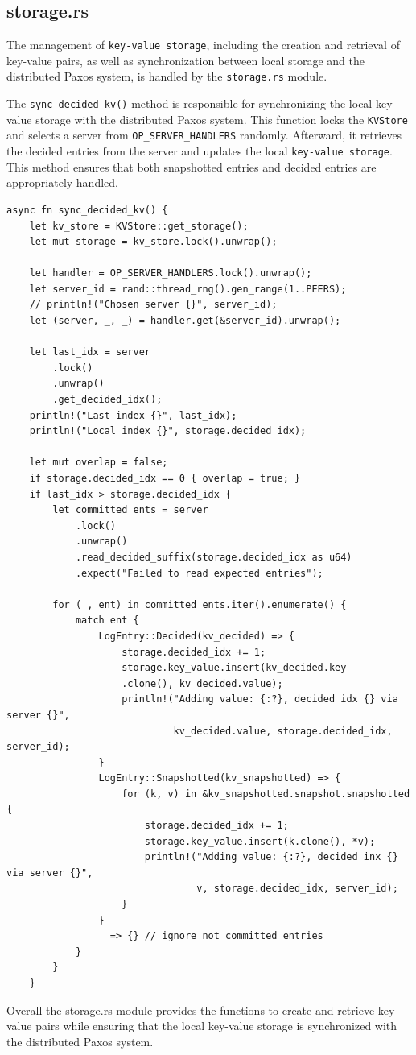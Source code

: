 \documentclass[a4paper, 11pt]{article}
\begin{document}
\subsection{storage.rs}

The management of \verb|key-value storage|, including the creation and retrieval of key-value pairs, as well as synchronization between local storage and the distributed Paxos system, is handled by the \verb|storage.rs| module.
\par
The \verb|sync_decided_kv()| method is responsible for synchronizing the local key-value storage with the distributed Paxos system. This function locks the \verb|KVStore| and selects a server from \verb|OP_SERVER_HANDLERS| randomly. Afterward, it retrieves the decided entries from the server and updates the local \verb|key-value storage|. This method ensures that both snapshotted entries and decided entries are appropriately handled.
\begin{verbatim}
async fn sync_decided_kv() {
    let kv_store = KVStore::get_storage();
    let mut storage = kv_store.lock().unwrap();

    let handler = OP_SERVER_HANDLERS.lock().unwrap();
    let server_id = rand::thread_rng().gen_range(1..PEERS);
    // println!("Chosen server {}", server_id);
    let (server, _, _) = handler.get(&server_id).unwrap();

    let last_idx = server
        .lock()
        .unwrap()
        .get_decided_idx();
    println!("Last index {}", last_idx);
    println!("Local index {}", storage.decided_idx);

    let mut overlap = false;
    if storage.decided_idx == 0 { overlap = true; }
    if last_idx > storage.decided_idx {
        let committed_ents = server
            .lock()
            .unwrap()
            .read_decided_suffix(storage.decided_idx as u64)
            .expect("Failed to read expected entries");

        for (_, ent) in committed_ents.iter().enumerate() {
            match ent {
                LogEntry::Decided(kv_decided) => {
                    storage.decided_idx += 1;
                    storage.key_value.insert(kv_decided.key
                    .clone(), kv_decided.value);
                    println!("Adding value: {:?}, decided idx {} via server {}",
                             kv_decided.value, storage.decided_idx, server_id);
                }
                LogEntry::Snapshotted(kv_snapshotted) => {
                    for (k, v) in &kv_snapshotted.snapshot.snapshotted {
                        storage.decided_idx += 1;
                        storage.key_value.insert(k.clone(), *v);
                        println!("Adding value: {:?}, decided inx {} via server {}",
                                 v, storage.decided_idx, server_id);
                    }
                }
                _ => {} // ignore not committed entries
            }
        }
    }
\end{verbatim}
\par
Overall the storage.rs module provides the functions to create and retrieve key-value pairs while ensuring that the local key-value storage is synchronized with the distributed Paxos system.
\end{document}
